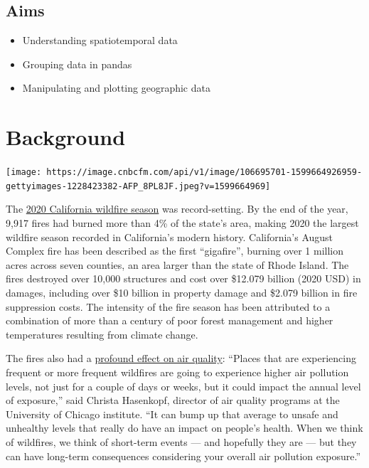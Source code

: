 \documentclass[
  letterpaper,
  DIV=11,
  numbers=noendperiod]{scrreprt}
\providecommand{\tightlist}{%
  \setlength{\itemsep}{0pt}\setlength{\parskip}{0pt}}\usepackage{longtable,booktabs,array}
\begin{document}
\hypertarget{aims-1}{%
\subsection{Aims}\label{aims-1}}

\begin{itemize}
\tightlist
\item
  Understanding spatiotemporal data
\item
  Grouping data in pandas
\item
  Manipulating and plotting geographic data
\end{itemize}

\hypertarget{background}{%
\section{Background}\label{background}}

\texttt{[image: https://image.cnbcfm.com/api/v1/image/106695701-1599664926959-gettyimages-1228423382-AFP\_8PL8JF.jpeg?v=1599664969]}

The \href{https://en.wikipedia.org/wiki/2020_California_wildfires}{2020
California wildfire season} was record-setting. By the end of the year,
9,917 fires had burned more than 4\% of the state's area, making 2020
the largest wildfire season recorded in California's modern history.
California's August Complex fire has been described as the first
``gigafire'', burning over 1 million acres across seven counties, an
area larger than the state of Rhode Island. The fires destroyed over
10,000 structures and cost over \$12.079 billion (2020 USD) in damages,
including over \$10 billion in property damage and \$2.079 billion in
fire suppression costs. The intensity of the fire season has been
attributed to a combination of more than a century of poor forest
management and higher temperatures resulting from climate change.

The fires also had a
\href{https://epic.uchicago.edu/news/pollution-from-californias-2020-wildfires-likely-offset-decades-of-air-quality-gains/}{profound
effect on air quality}: ``Places that are experiencing frequent or more
frequent wildfires are going to experience higher air pollution levels,
not just for a couple of days or weeks, but it could impact the annual
level of exposure,'' said Christa Hasenkopf, director of air quality
programs at the University of Chicago institute. ``It can bump up that
average to unsafe and unhealthy levels that really do have an impact on
people's health. When we think of wildfires, we think of short-term
events --- and hopefully they are --- but they can have long-term
consequences considering your overall air pollution exposure.''
\end{document}
